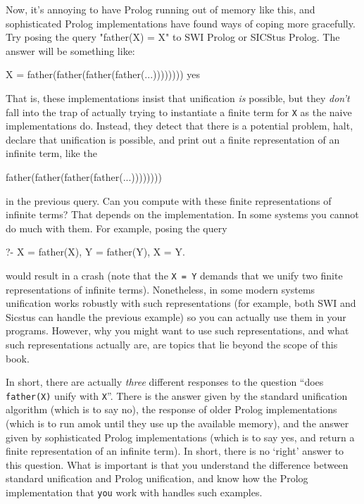 Now, it's annoying to have Prolog running out of memory like this, and
sophisticated Prolog implementations have found  ways of coping more
gracefully. Try posing the query "father(X) = X" to SWI Prolog or
SICStus Prolog. The answer will be something like:
\begin{LPNcodedisplay}
X = father(father(father(father(...))))))))
yes
\end{LPNcodedisplay}
%
That is, these implementations insist that unification \textit{is}
possible, but they \textit{don't} fall into the trap of actually
trying to instantiate a finite term for \texttt{X} as the naive
implementations do. Instead, they detect that there is a potential
problem, halt, declare that unification is possible, and print out a
finite representation of an infinite term, like the
\begin{LPNcodedisplay}
father(father(father(father(...))))))))
\end{LPNcodedisplay}
in the previous query.  Can you compute with these finite
representations of infinite terms?  That depends on the
implementation.  In some systems you cannot do much with them. For
example, posing the query
\begin{LPNcodedisplay}
?- X = father(X), Y = father(Y), X = Y.
\end{LPNcodedisplay}
would result in a crash (note that the \texttt{X = Y} demands that we
unify two finite representations of infinite terms). Nonetheless, in some
modern systems unification works robustly with such representations
(for example, both SWI and Sicstus can handle the previous example) so you can
actually use them in your programs. However, why you might want to use
such representations, and what such representations actually are, are
topics that lie beyond the scope of this book.


In short, there are actually \textit{three} different responses to the
question ``does \texttt{father(X)} unify with \texttt{X}''. There is
the answer given by the standard unification algorithm (which is to
say no), the response of older Prolog implementations (which is to run
amok until they use up the available memory), and the answer given by
sophisticated Prolog implementations (which is to say yes, and return
a finite representation of an infinite term). In short, there is no
`right' answer to this question. What is important is that you
understand the difference between standard unification and Prolog
unification, and know how the Prolog implementation that \texttt{you}
work with handles such examples.

